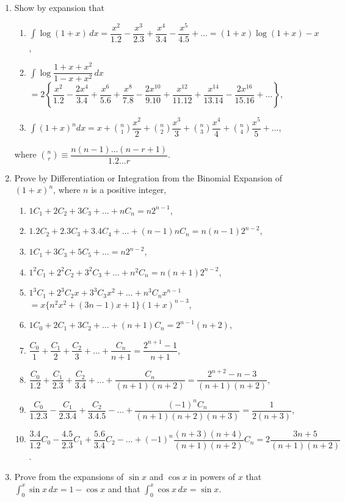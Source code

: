 \documentclass[11pt, a4paper]{article}
\begin{document}
\begin{enumerate}[leftmargin=2em]
\item Show by expansion that
\begin{enumerate}[label=(\alph*)]
\item $\displaystyle\int \log(1+x)\, dx = \dfrac{x^2}{1.2}-\dfrac{x^3}{2.3}+\dfrac{x^4}{3.4}-\dfrac{x^5}{4.5}+\dots = (1+x)\log(1+x)-x$,
\item $\displaystyle\int \log\dfrac{1+x+x^2}{1-x+x^2}\, dx$
$=2\left\{\dfrac{x^2}{1.2}-\dfrac{2x^4}{3.4}+\dfrac{x^6}{5.6}+\dfrac{x^8}{7.8}-\dfrac{2x^{10}}{9.10}+\dfrac{x^{12}}{11.12}+\dfrac{x^{14}}{13.14}-\dfrac{2x^{16}}{15.16}+\dots\right\}$,
\item $\displaystyle\int (1+x)^n dx = x+\binom{n}{1}\dfrac{x^2}{2}+\binom{n}{2}\dfrac{x^3}{3}+\binom{n}{3}\dfrac{x^4}{4}+\binom{n}{4}\dfrac{x^5}{5}+\dots$,
\end{enumerate}
where $\displaystyle\binom{n}{r} \equiv \dfrac{n(n-1)\dots(n-r+1)}{1.2\dots r}$.

\item Prove by Differentiation or Integration from the Binomial Expansion of $(1+x)^n$, where $n$ is a positive integer,
\begin{enumerate}[label=(\alph*)]
\item $1C_1+2C_2+3C_3+\dots+nC_n = n2^{n-1}$,
\item $1.2C_2+2.3C_3+3.4C_4+\dots+(n-1)nC_n = n(n-1)2^{n-2}$,
\item $1C_1+3C_3+5C_5+\dots = n2^{n-2}$,
\item $1^2C_1+2^2C_2+3^2C_3+\dots+n^2C_n = n(n+1)2^{n-2}$,
\item $1^3C_1+2^3C_2 x+3^3C_3x^2+\dots+n^3C_nx^{n-1}$
$=x\{n^2x^2+(3n-1)x+1\}(1+x)^{n-3}$,
\item $1C_0+2C_1+3C_2+\dots+(n+1)C_n = 2^{n-1}(n+2)$,
\item $\dfrac{C_0}{1}+\dfrac{C_1}{2}+\dfrac{C_2}{3}+\dots+\dfrac{C_n}{n+1} = \dfrac{2^{n+1}-1}{n+1}$,
\item $\dfrac{C_0}{1.2}+\dfrac{C_1}{2.3}+\dfrac{C_2}{3.4}+\dots+\dfrac{C_n}{(n+1)(n+2)} = \dfrac{2^{n+2}-n-3}{(n+1)(n+2)}$,
\item $\dfrac{C_0}{1.2.3}-\dfrac{C_1}{2.3.4}+\dfrac{C_2}{3.4.5}-\dots+\dfrac{(-1)^n C_n}{(n+1)(n+2)(n+3)} = \dfrac{1}{2(n+3)}$,
\item $\dfrac{3.4}{1.2}C_0 - \dfrac{4.5}{2.3}C_1 + \dfrac{5.6}{3.4}C_2 - \dots + (-1)^n\dfrac{(n+3)(n+4)}{(n+1)(n+2)}C_n = 2\dfrac{3n+5}{(n+1)(n+2)}$.
\end{enumerate}

\item Prove from the expansions of $\sin x$ and $\cos x$ in powers of $x$ that $\displaystyle\int_0^x \sin x\, dx = 1-\cos x$ and that $\displaystyle\int_0^x \cos x\, dx = \sin x$.


\end{enumerate}
\end{document}
